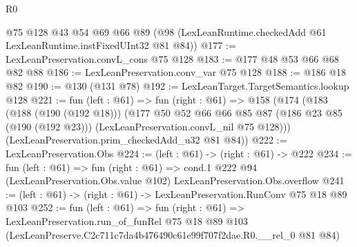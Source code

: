 \begin{lexlean}{R0}
\begin{coremodule}
    @75
    @128
    @43
    @54
    @69
    @66
    @89
    (@98 (LexLeanRuntime.checkedAdd @61 LexLeanRuntime.instFixedUInt32 @81 @84))
@177 := LexLeanPreservation.convL_cons @75 @128
@183 := @177 @48 @53 @66 @68 @82 @88
@186 := LexLeanPreservation.conv_var @75 @128
@188 := @186 @18 @82
@190 := @130 (@131 @78)
@192 := LexLeanTarget.TargetSemantics.lookup @128
@221 := fun (left : @61) =>
  fun (right : @61) =>
  @158
    (@174
      (@183
        (@188 (@190 (@192 @18)))
        (@177
          @50
          @52
          @66
          @66
          @85
          @87
          (@186 @23 @85 (@190 (@192 @23)))
          (LexLeanPreservation.convL_nil @75 @128)))
      (LexLeanPreservation.prim_checkedAdd_u32 @81 @84))
@222 := LexLeanPreservation.Obs
@224 := (left : @61) -> (right : @61) -> @222
@234 := fun (left : @61) =>
  fun (right : @61) =>
  cond.{1} @222 @94 (LexLeanPreservation.Obs.value @102) LexLeanPreservation.Obs.overflow
@241 := (left : @61) -> (right : @61) -> LexLeanPreservation.RunConv @75 @18 @89 @103
@252 := fun (left : @61) =>
  fun (right : @61) =>
  LexLeanPreservation.run_of_funRel
    @75
    @18
    @89
    @103
    (LexLeanPreserve.C2c711c7da4b476490c61e99f707f2dae.R0.__rel_0 @81 @84)
\end{coremodule}
\end{lexlean}

